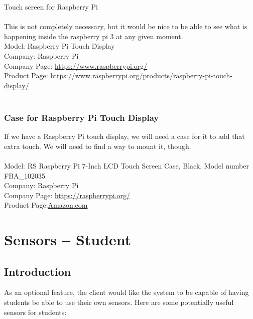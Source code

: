 Touch screen for Raspberry Pi\\
 \\
This is not completely necessary, but it would be nice to be able to see what is happening inside the raspberry pi 3 at any given moment.
 \\
Model: Raspberry Pi Touch Display\\
Company: Raspberry Pi \\
Company Page: \href{https://www.raspberrypi.org/}{https://www.raspberrypi.org/} \\
Product Page: \href{https://www.raspberrypi.org/products/raspberry-pi-touch-display/}{https://www.raspberrypi.org/products/raspberry-pi-touch-display/} \\
 \\
\subsubsection{Case for Raspberry Pi Touch Display}
If we have a Raspberry Pi touch display, we will need a case for it to add that extra touch. We will need to find a way to mount it, though. \\
 \\
Model: RS Raspberry Pi 7-Inch LCD Touch Screen Case, Black, Model number FBA\_102035\\
Company: Raspberry Pi \\
Company Page: \href{https://raspberrypi.org/}{https://raspberrypi.org/} \\
Product Page:\href{ https://www.amazon.com/Raspberry-Pi-7-Inch-Touch-Screen/dp/B01GQFUWIC/ref=asc_df_B01GQFUWIC/?tag=hyprod-20&linkCode=df0&hvadid=309751315916&hvpos=1o1&hvnetw=g&hvrand=10505497938605347385&hvpone=&hvptwo=&hvqmt=&hvdev=c&hvdvcmdl=&hvlocint=&hvlocphy=9061320&hvtargid=pla-406360183578&psc=1&tag=&ref=&adgrpid=67183599252&hvpone=&hvptwo=&hvadid=309751315916&hvpos=1o1&hvnetw=g&hvrand=10505497938605347385&hvqmt=&hvdev=c&hvdvcmdl=&hvlocint=&hvlocphy=9061320&hvtargid=pla-406360183578}{Amazon.com}

\section{Sensors – Student}

\subsection{Introduction}

As an optional feature, the client would like the system to be capable of having students be able to use their own sensors. Here are some potentially useful sensors for students:

